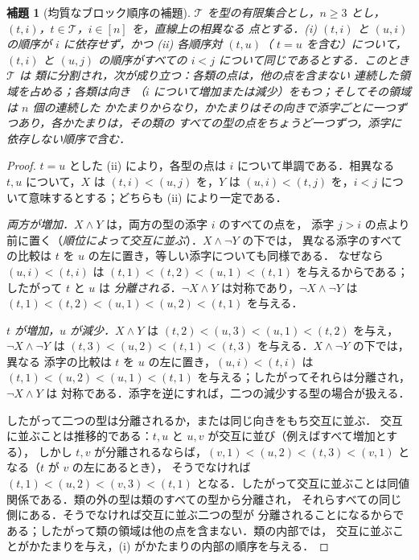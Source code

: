 \documentclass[11pt,a4paper]{ltjsarticle}
\numberwithin{equation}{section}
\theoremstyle{plain}
\newtheorem{lemma}[theorem]{補題}
\theoremstyle{definition}
\theoremstyle{remark}
\theoremstyle{plain}
\begin{document}
\begin{lemma}[均質なブロック順序の補題]
\label{lem:group-block-order}
$\mathcal T$ を型の有限集合とし，$n\ge3$ とし，$(t,i)$，$t\in\mathcal T$，$i\in[n]$ を，直線上の相異なる
点とする．\textup{(i)} $(t,i)$ と $(u,i)$ の順序が
$i$ に依存せず，かつ \textup{(ii)} 各順序対 $(t,u)$（
$t=u$ を含む）について，$(t,i)$ と $(u,j)$ の順序がすべての $i<j$ について同じであるとする．このとき $\mathcal T$ は
類に分割され，次が成り立つ：各類の点は，他の点を含まない
連続した領域を占める；各類は向き
（$i$ について増加または減少）をもつ；そしてその領域は $n$ 個の連続した
\emph{かたまり}からなり，かたまりはその向きで添字ごとに一つずつあり，各かたまりは，その類の
すべての型の点をちょうど一つずつ，添字に依存しない順序で含む．
\end{lemma}

\begin{proof}
$t=u$ とした (ii) により，各型の点は $i$ について単調である．相異なる
$t,u$ について，$X$ は $(t,i)<(u,j)$ を，$Y$ は $(u,i)<(t,j)$ を，$i<j$ について意味するとする；どちらも
(ii) により一定である．

\emph{両方が増加．}$X\wedge Y$ は，両方の型の添字 $i$ のすべての点を，
添字 $j>i$ の点より前に置く（\emph{順位によって交互に並ぶ}）．$X\wedge\neg Y$ の下では，
異なる添字のすべての比較は $t$ を $u$ の左に置き，等しい添字についても同様である．
なぜなら $(u,i)<(t,i)$ は $(t,1)<(t,2)<(u,1)<(t,1)$ を与えるからである；したがって $t$ と $u$ は
\emph{分離される}．$\neg X\wedge Y$ は対称であり，$\neg X\wedge\neg Y$ は
$(t,1)<(t,2)<(u,1)<(u,2)<(t,1)$ を与える．

\emph{$t$ が増加，$u$ が減少．}$X\wedge Y$ は
$(t,2)<(u,3)<(u,1)<(t,2)$ を与え，$\neg X\wedge\neg Y$ は
$(t,3)<(u,2)<(t,1)<(t,3)$ を与える．$X\wedge\neg Y$ の下では，異なる
添字の比較は $t$ を $u$ の左に置き，$(u,i)<(t,i)$ は
$(t,1)<(u,2)<(u,1)<(t,1)$ を与える；したがってそれらは分離され，$\neg X\wedge Y$ は
対称である．添字を逆にすれば，二つの減少する型の場合が扱える．

したがって二つの型は分離されるか，または同じ向きをもち交互に並ぶ．
交互に並ぶことは推移的である：$t,u$ と $u,v$ が交互に並び（例えばすべて増加とする），
しかし $t,v$ が分離されるならば，$(v,1)<(u,2)<(t,3)<(v,1)$ となる（$t$ が $v$ の左にあるとき），
そうでなければ $(t,1)<(u,2)<(v,3)<(t,1)$ となる．したがって交互に並ぶことは同値
関係である．類の外の型は類のすべての型から分離され，
それらすべての同じ側にある．そうでなければ交互に並ぶ二つの型が
分離されることになるからである；したがって類の領域は他の点を含まない．類の内部では，
交互に並ぶことがかたまりを与え，(i) がかたまりの内部の順序を与える．
\end{proof}
\end{document}

